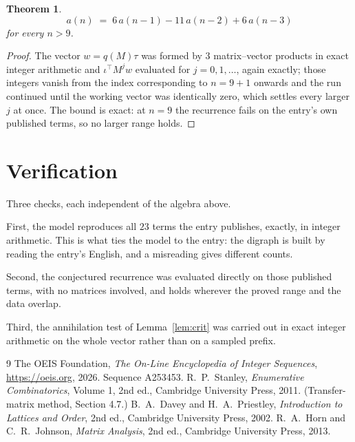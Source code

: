 \documentclass[11pt,a4paper]{article}
\theoremstyle{plain}
\newtheorem{theorem}{Theorem}
\theoremstyle{definition}
\begin{document}
\begin{theorem}
\[
a(n)\;=\;6\,a(n-1) - 11\,a(n-2) + 6\,a(n-3)
\]
for every $n>9$.
\end{theorem}

\begin{proof}
The vector $w=q(M)\tau$ was formed by $3$ matrix--vector products in exact integer
arithmetic and $\iota^{\!\top}M^{j}w$ evaluated for $j=0,1,\dots$, again exactly; those
integers vanish from the index corresponding to $n=9+1$ onwards and the run continued
until the working vector was identically zero, which settles every larger $j$ at once. The bound is exact: at $n=9$ the recurrence fails on the entry's own published terms, so no larger range holds.
\end{proof}

\section{Verification}

Three checks, each independent of the algebra above.

First, the model reproduces all $23$ terms the entry publishes, exactly, in integer
arithmetic. This is what ties the model to the entry: the digraph is built by reading the
entry's English, and a misreading gives different counts.

Second, the conjectured recurrence was evaluated directly on those published terms, with no
matrices involved, and holds wherever the proved range and the data overlap.

Third, the annihilation test of Lemma~\ref{lem:crit} was carried out in exact integer
arithmetic on the whole vector rather than on a sampled prefix.

\begin{thebibliography}{9}
 The OEIS Foundation, \emph{The On-Line Encyclopedia of Integer
Sequences}, \url{https://oeis.org}, 2026. Sequence A253453.
 R.~P.~Stanley, \emph{Enumerative Combinatorics}, Volume 1, 2nd ed.,
Cambridge University Press, 2011. (Transfer-matrix method, Section 4.7.)
 B.~A.~Davey and H.~A.~Priestley, \emph{Introduction to Lattices and
Order}, 2nd ed., Cambridge University Press, 2002.
 R.~A.~Horn and C.~R.~Johnson, \emph{Matrix Analysis}, 2nd ed., Cambridge
University Press, 2013.
\end{thebibliography}
\end{document}
